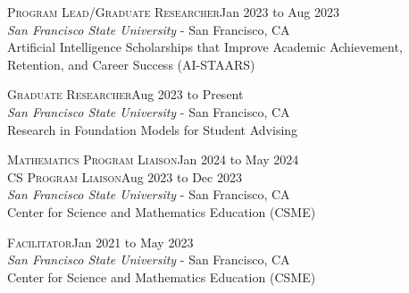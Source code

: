 \documentclass[hidelinks, 10pt]{article}
\begin{document}
{%

\vspace{5mm}
\hrulefill

\vspace{4mm}

\begin{minipage}[ct]{0.9\linewidth}
    \textsc{Program Lead/Graduate Researcher}\hfill Jan 2023 to Aug
    2023\\
    {\emph{San Francisco State University} - San Francisco, CA}\\
    Artificial Intelligence Scholarships that Improve Academic Achievement, Retention, and Career Success (AI-STAARS)
\end{minipage}

\vspace{2.5mm}

\begin{minipage}[ct]{0.9\linewidth}
    \textsc{Graduate Researcher}\hfill Aug 2023 to Present\\
    {\emph{San Francisco State University} - San Francisco, CA}\\
    Research in Foundation Models for Student Advising
\end{minipage}

\vspace{2.5mm}

\begin{minipage}[ct]{0.9\linewidth}
    \textsc{Mathematics Program Liaison}\hfill Jan 2024 to May 2024\\
    \textsc{CS Program Liaison}\hfill Aug 2023 to Dec 2023\\
    {\emph{San Francisco State University} - San Francisco, CA}\\
    Center for Science and Mathematics Education (CSME)
\end{minipage}

\vspace{2.5mm}

\begin{minipage}[ct]{0.9\linewidth}
    \textsc{Facilitator}\hfill Jan 2021 to May 2023\\
    {\emph{San Francisco State University} - San Francisco, CA}\\
    Center for Science and Mathematics Education (CSME)
\end{minipage}

}
\end{document}
